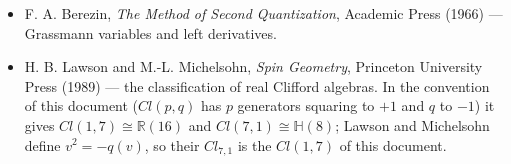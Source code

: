 \documentclass[10pt,a4paper]{article}
\begin{document}
\begin{itemize}
\item F. A. Berezin, \emph{The Method of Second Quantization}, Academic Press (1966) — Grassmann variables and left derivatives.
\item H. B. Lawson and M.-L. Michelsohn, \emph{Spin Geometry}, Princeton University Press (1989) — the classification of real Clifford algebras. In the convention of this document ($Cl(p,q)$ has $p$ generators squaring to $+1$ and $q$ to $-1$) it gives $Cl(1,7)\cong\mathbb R(16)$ and $Cl(7,1)\cong\mathbb H(8)$; Lawson and Michelsohn define $v^2=-q(v)$, so their $Cl_{7,1}$ is the $Cl(1,7)$ of this document.
\end{itemize}
\end{document}
